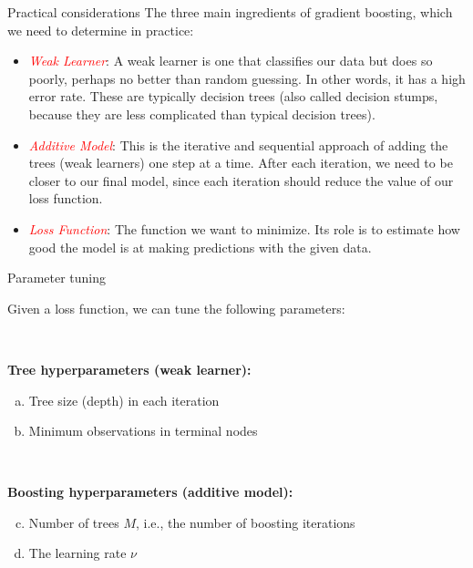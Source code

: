\documentclass[
  10pt,
  ignorenonframetext,
]{beamer}
\begin{document}
\begin{frame}{Practical considerations}
\protect\hypertarget{practical-considerations}{}
The three main ingredients of gradient boosting, which we need to
determine in practice:

\vspace{2mm}

\begin{itemize}
\item
  \emph{\textcolor{red}{Weak Learner}}: A weak learner is one that
  classifies our data but does so poorly, perhaps no better than random
  guessing. In other words, it has a high error rate. These are
  typically decision trees (also called decision stumps, because they
  are less complicated than typical decision trees).
\item
  \emph{\textcolor{red}{Additive Model}}: This is the iterative and
  sequential approach of adding the trees (weak learners) one step at a
  time. After each iteration, we need to be closer to our final model,
  since each iteration should reduce the value of our loss function.
\item
  \emph{\textcolor{red}{Loss Function}}: The function we want to
  minimize. Its role is to estimate how good the model is at making
  predictions with the given data.
\end{itemize}
\end{frame}

\begin{frame}{Parameter tuning}
\protect\hypertarget{parameter-tuning}{}
\(~\)

Given a loss function, we can tune the following parameters:

\(~\)

\textbf{Tree hyperparameters (weak learner):}

\begin{enumerate}
[a)]
\item
  Tree size (depth) in each iteration
\item
  Minimum observations in terminal nodes
\end{enumerate}

\(~\)

\textbf{Boosting hyperparameters (additive model):}

\begin{enumerate}
[a)]
\setcounter{enumi}{2}
\item
  Number of trees \(M\), i.e., the number of boosting iterations
\item
  The learning rate \(\nu\)
\end{enumerate}
\end{frame}
\end{document}
